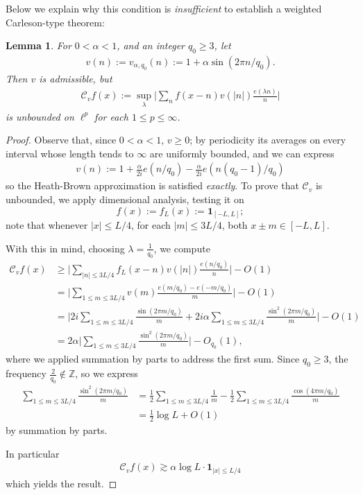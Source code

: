\documentclass[12pt]{amsart}
\numberwithin{equation}{section}
\newtheorem{lemma}[theorem]{Lemma}
\theoremstyle{definition}
\begin{document}
Below we explain why this condition is \emph{insufficient} to establish a weighted Carleson-type theorem:

\begin{lemma}
For $0 < \alpha < 1$, and an integer $q_0 \geq 3$, let
\begin{align}
    v(n) := v_{\alpha,q_0}(n) := 1 + \alpha \sin(2 \pi n/q_0).
\end{align}
Then $v$ is admissible, but
\begin{align}
    \mathcal{C}_v f(x) := \sup_\lambda \big|\sum_n f(x-n) v(|n|) \frac{e(\lambda n)}{n} \big|
\end{align}
is unbounded on $\ell^p$ for each $1 \leq p \leq \infty$.
\end{lemma}
\begin{proof}
Observe that, since $0 < \alpha < 1$, $v \geq 0$; by periodicity its averages on every interval whose length tends to $\infty$ are uniformly bounded, and we can express
\begin{align}
    v(n) := 1 + \frac{\alpha}{2i} e(n/q_0) - \frac{\alpha}{2i} e(n(q_0-1)/q_0)
\end{align}
so the Heath-Brown approximation is satisfied \emph{exactly}. To prove that $\mathcal{C}_v$ is unbounded, we apply dimensional analysis, testing it on
\[ f(x) := f_L(x) := \mathbf{1}_{[-L,L]};\]
note that whenever $|x| \leq L/4$, for each $|m| \leq 3L/4$, both $x\pm m \in [-L,L]$.

With this in mind, choosing $\lambda = \frac{1}{q_0}$, we compute
\begin{align}
    \mathcal{C}_v f(x) &\geq \big| \sum_{|n| \leq 3L/4} f_L(x-n) v(|n|) \frac{e(n/q_0)}{n}\big| - O(1) \\
    &= \big| \sum_{1 \leq m \leq 3L/4} v(m) \frac{e(m/q_0) - e(-m/q_0)}{m}\big| - O(1) \\
    & = \big| 2i \sum_{ 1 \leq m \leq 3L/4} \frac{\sin(2\pi m/q_0)}{m} + 2i \alpha \sum_{1 \leq m \leq 3L/4} \frac{\sin^2(2\pi m/q_0)}{m} \big| - O(1) \\
    & = 2 \alpha \big| \sum_{1 \leq m \leq 3L/4} \frac{\sin^2(2\pi m/q_0)}{m} \big| - O_{q_0}(1),
\end{align}
where we applied summation by parts to address the first sum. Since $q_0 \geq 3$, the frequency $\frac{2}{q_0} \notin \mathbb{Z}$, so we express
\begin{align}
    \sum_{1 \leq m \leq 3L/4} \frac{\sin^2(2\pi m/q_0)}{m} &= \frac{1}{2} \sum_{1 \leq m \leq 3L/4} \frac{1}{m} - \frac{1}{2} \sum_{1 \leq m \leq 3L/4} \frac{\cos(4 \pi m/q_0)}{m} \\
    & =\frac{1}{2} \log L + O(1)
\end{align}
by summation by parts.

In particular
\begin{align}
    \mathcal{C}_v f(x) \gtrsim \alpha \log L \cdot \mathbf{1}_{|x| \leq L/4}
\end{align}
which yields the result.
\end{proof}
\end{document}
